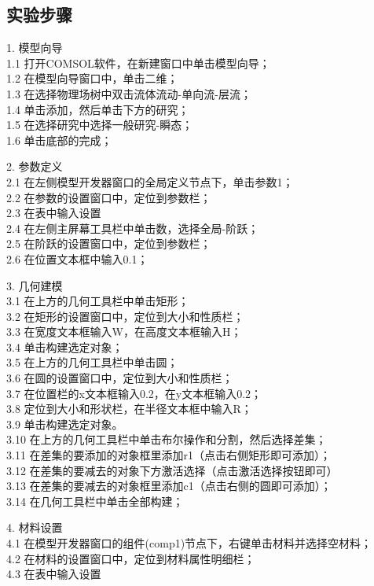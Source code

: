 \documentclass[a4paper,zihao=5,UTF8,fontset=fandol]{phyreport}
\begin{document}
\subsection{实验步骤}
1. 模型向导\\
1.1 打开COMSOL软件，在新建窗口中单击模型向导；\\
1.2 在模型向导窗口中，单击二维；\\
1.3 在选择物理场树中双击流体流动-单向流-层流；\\
1.4 单击添加，然后单击下方的研究；\\
1.5 在选择研究中选择一般研究-瞬态；\\
1.6 单击底部的完成；

2. 参数定义\\
2.1 在左侧模型开发器窗口的全局定义节点下，单击参数1；\\
2.2 在参数的设置窗口中，定位到参数栏；\\
2.3 在表中输入设置\\
2.4 在左侧主屏幕工具栏中单击数，选择全局-阶跃；\\
2.5 在阶跃的设置窗口中，定位到参数栏；\\
2.6 在位置文本框中输入0.1；

3. 几何建模\\
3.1 在上方的几何工具栏中单击矩形；\\
3.2 在矩形的设置窗口中，定位到大小和性质栏；\\
3.3 在宽度文本框输入W，在高度文本框输入H；\\
3.4 单击构建选定对象；\\
3.5 在上方的几何工具栏中单击圆；\\
3.6 在圆的设置窗口中，定位到大小和性质栏；\\
3.7 在位置栏的x文本框输入0.2，在y文本框输入0.2；\\
3.8 定位到大小和形状栏，在半径文本框中输入R；\\
3.9 单击构建选定对象。\\
3.10 在上方的几何工具栏中单击布尔操作和分割，然后选择差集；\\
3.11 在差集的要添加的对象框里添加r1（点击右侧矩形即可添加）；\\
3.12 在差集的要减去的对象下方激活选择（点击激活选择按钮即可）\\
3.13 在差集的要减去的对象框里添加c1（点击右侧的圆即可添加）；\\
3.14 在几何工具栏中单击全部构建；

4. 材料设置\\
4.1 在模型开发器窗口的组件(comp1)节点下，右键单击材料并选择空材料；\\
4.2 在材料的设置窗口中，定位到材料属性明细栏；\\
4.3 在表中输入设置
\end{document}
